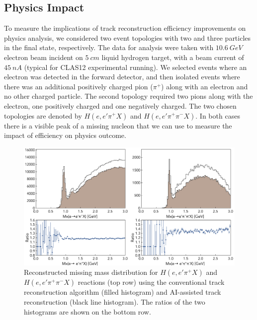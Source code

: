 \subsection{Physics Impact}

To measure the implications of track reconstruction efficiency improvements on physics analysis, 
we considered two event topologies with two and three particles in the final state, respectively. 
The data for analysis were taken with $10.6~GeV$ electron beam incident on $5~cm$ liquid 
hydrogen target, with a beam current of $45~nA$ (typical for CLAS12 experimental running). 
We selected events where an electron was detected in the forward detector, and then isolated 
events where there was an additional positively charged pion ($\pi^+$) along with an electron 
and no other charged particle. The second topology required two pions along with the electron, 
one positively charged and one negatively charged. The two chosen topologies are denoted by 
$H(e,e'\pi^+X)$ and $H(e,e'\pi^+\pi^-X)$. In both cases there is a visible peak of a missing nucleon 
that we can use to measure the impact of efficiency on physics outcome. 

 \begin{figure}[!ht]
\begin{center}
 \includegraphics[width=6.0in]{images/physics_scan.pdf}
\caption {Reconstructed missing mass distribution for $H(e,e'\pi^+X)$ and $H(e,e'\pi^+\pi^-X)$ 
reactions (top row) using the conventional track reconstruction algorithm (filled histogram) and  
AI-assisted track reconstruction (black line histogram). The ratios of the two histograms are shown 
on the bottom row. }
 \label{physics:outcome}
 \end{center}
\end{figure}

